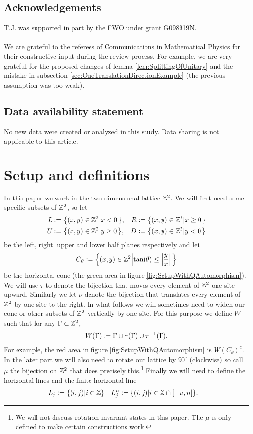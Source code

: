 \documentclass[12pt,a4paper,twoside]{article}
\numberwithin{equation}{section}
\begin{document}
\subsection*{Acknowledgements}
T.J. was supported in part by the FWO under grant G098919N.\\\\
We are grateful to the referees of Communications in Mathematical Physics for their constructive input during the review process. For example, we are very grateful for the proposed changes of lemma \ref{lem:SplittingOfUnitary} and the mistake in subsection \ref{sec:OneTranslationDirectionExample} (the previous assumption was too weak).
\subsection*{Data availability statement}
No new data were created or analyzed in this study. Data sharing is not applicable to this article.
\clearpage
\section{Setup and definitions}\label{sec:Setup}
In this paper we work in the two dimensional lattice $\mathbb Z^2$. We will first need some specific subsets of $\mathbb Z^2$, so let
\begin{align}
	L&\defeq \left\{(x,y)\in\ZZ^2\left|x<0\right.\right\},&R&\defeq \left\{(x,y)\in\ZZ^2\left|x\geq 0\right.\right\}\\
	U&\defeq \left\{(x,y)\in\ZZ^2\left|y\geq 0\right.\right\},&D&\defeq \left\{(x,y)\in\ZZ^2\left|y<0\right.\right\}
\end{align}
be the left, right, upper and lower half planes respectively and let
\begin{equation}
	C_\theta\defeq \left\{(x,y)\in\ZZ^2\left|\tan(\theta)\leq\abs{\frac{y}{x}}\right.\right\}
\end{equation}
be the horizontal cone (the green area in figure \ref{fig:SetupWithQAutomorphism}). We will use $\tau$ to denote the bijection that moves every element of $\mathbb Z^2$ one site upward. Similarly we let $\nu$ denote the bijection that translates every element of $\mathbb Z^2$ by one site to the right. In what follows we will sometimes need to widen our cone or other subsets of $\mathbb Z^2$ vertically by one site. For this purpose we define $W$ such that for any $\Gamma\subset\mathbb Z^2$,
\begin{equation}
	W(\Gamma)\vcentcolon= \Gamma\cup\tau(\Gamma)\cup\tau^{-1}(\Gamma).
\end{equation}
For example, the red area in figure \ref{fig:SetupWithQAutomorphism} is $W(C_\theta)^c$. In the later part we will also need to rotate our lattice by $90^\circ$ (clockwise) so call $\mu$ the bijection on $\mathbb Z^2$ that does precisely this.\footnote{We will not discuss rotation invariant states in this paper. The $\mu$ is only defined to make certain constructions work.} Finally we will need to define the horizontal lines and the finite horizontal line
\begin{align}
	L_j&\vcentcolon= \{(i,j)|i\in\mathbb Z\}&L_j^n&\vcentcolon= \{(i,j)|i\in\mathbb Z\cap[-n,n]\}.
\end{align}
\end{document}
